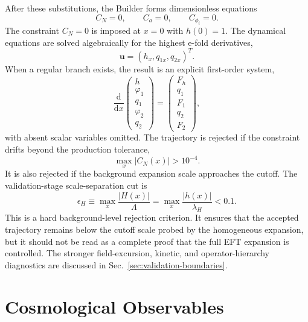 \documentclass[aps,prd,twocolumn,superscriptaddress,nofootinbib,longbibliography]{revtex4-2}
\newcommand{\dd}{\mathrm{d}}
\newcommand{\Lam}{\Lambda}
\newcommand{\varphione}{\varphi_1}
\newcommand{\varphitwo}{\varphi_2}
\begin{document}
After these substitutions, the Builder forms dimensionless equations
\begin{equation}
C_N=0,\qquad C_a=0,\qquad C_{\phi_i}=0.
\end{equation}
The constraint $C_N=0$ is imposed at $x=0$ with $h(0)=1$.  The dynamical equations are solved algebraically for the highest e-fold derivatives,
\begin{equation}
\bm u=(h_x,q_{1x},q_{2x})^T.
\end{equation}
When a regular branch exists, the result is an explicit first-order system,
\begin{equation}
\frac{\dd}{\dd x}
\begin{pmatrix}
h\\ \varphione\\ q_1\\ \varphitwo\\ q_2
\end{pmatrix}
=
\begin{pmatrix}
F_h\\ q_1\\ F_1\\ q_2\\ F_2
\end{pmatrix},
\label{eq:first-order}
\end{equation}
with absent scalar variables omitted.  The trajectory is rejected if the constraint drifts beyond the production tolerance,
\begin{equation}
\max_x|C_N(x)|>10^{-4}.
\label{eq:constraint-cut}
\end{equation}
It is also rejected if the background expansion scale approaches the cutoff.  The validation-stage scale-separation cut is
\begin{equation}
\epsilon_H\equiv
\max_x\frac{|H(x)|}{\Lam}
=
\max_x\frac{|h(x)|}{\lambda_H}
<0.1 .
\label{eq:eft-cut}
\end{equation}
This is a hard background-level rejection criterion.  It ensures that the accepted trajectory remains below the cutoff scale probed by the homogeneous expansion, but it should not be read as a complete proof that the full EFT expansion is controlled.  The stronger field-excursion, kinetic, and operator-hierarchy diagnostics are discussed in Sec.~\ref{sec:validation-boundaries}.

\section{Cosmological Observables}
\label{sec:observables}
\end{document}
